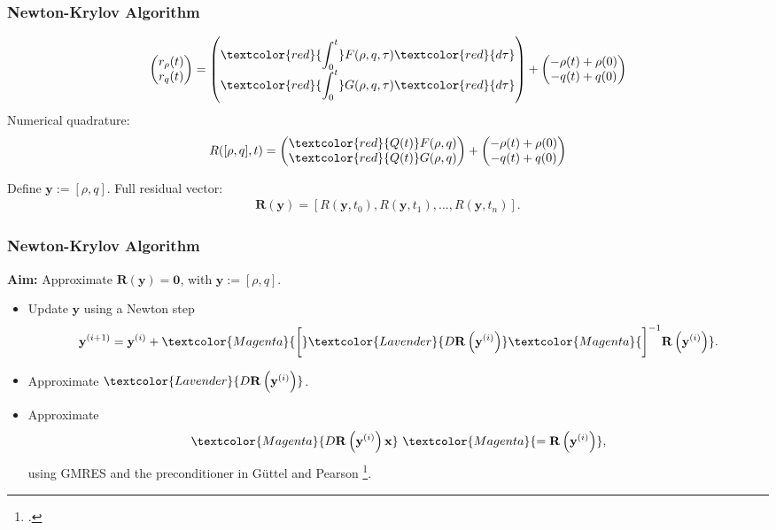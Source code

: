 \documentclass[aspectratio=169,xcolor=dvipsnames]{beamer}
\begin{document}
\begin{frame}
	\frametitle{Newton-Krylov Algorithm}
\begin{align*}
	\begin{pmatrix}
		r_\rho(t) \\ 
		r_q(t) 
	\end{pmatrix}
	= 
	\begin{pmatrix}
		\displaystyle \textcolor{red}{\int_0^t} F(\rho, q,\tau) \textcolor{red}{d\tau}\\
		\displaystyle \textcolor{red}{\int_0^t} G(\rho, q,\tau) \textcolor{red}{d\tau}
	\end{pmatrix} 
	+ 
	\begin{pmatrix}
		- \rho(t) + \rho(0)\\
		- q(t) + q(0)
	\end{pmatrix}
\end{align*}
Numerical quadrature:
\begin{align*}
R([\rho, q],t)
	= 
	\begin{pmatrix}
		\textcolor{red}{Q(t)} F(\rho, q) \\
		\textcolor{red}{Q(t)} G(\rho, q)
	\end{pmatrix}
	+ 
\begin{pmatrix}
	- \rho(t) + \rho(0)\\
	- q(t) + q(0)
\end{pmatrix}
\end{align*}
	
	Define $\mathbf y :=[\rho,q]$. Full residual vector:
	\begin{align*}
	\mathbf R(\mathbf y) = \left[R(\mathbf y,t_0),R(\mathbf y,t_1),...,R(\mathbf y,t_n)\right].
	\end{align*}
	

\end{frame}
\begin{frame}
	\frametitle{Newton-Krylov Algorithm}
	\textbf{Aim:} Approximate $\mathbf R(\mathbf y) = \mathbf 0$, with $\mathbf y:=[\rho,q]$.
	\vspace{0.3 cm}
	\begin{itemize}
		\item Update $\mathbf y$ using a Newton step
		\begin{align*}
			\mathbf y^{(i+1)} = \mathbf y^{(i)} + \textcolor{Magenta}{\bigg[}\textcolor{Lavender}{D\mathbf R\left(\mathbf y^{(i)}\right)}\textcolor{Magenta}{\bigg]^{-1} \mathbf R\left(\mathbf y^{(i)}\right)}.
		\end{align*}
		\item Approximate $\textcolor{Lavender}{D\mathbf R\left(\mathbf y^{(i)}\right)}$.\\
		\item Approximate
		\begin{align*}
			\textcolor{Magenta}{D\mathbf R\left(\mathbf y^{(i)}\right) \mathbf x} \ \textcolor{Magenta}{= \mathbf R\left(\mathbf 	y^{(i)}\right)},
		\end{align*}
		using GMRES and the preconditioner in Güttel and Pearson \footcite{GuettelPearson}.
		
		
	\end{itemize}
	
\end{frame}
\end{document}
